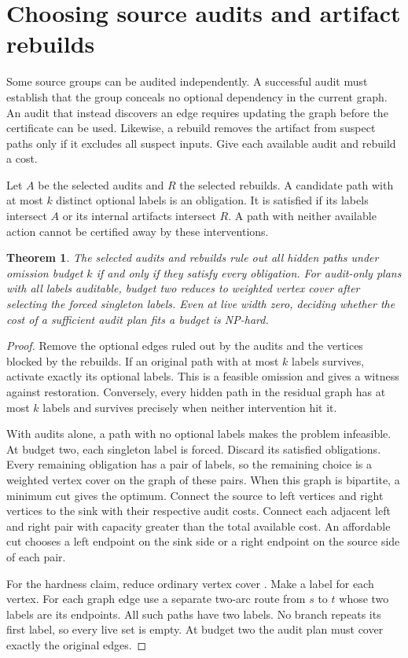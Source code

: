\documentclass[11pt]{article}
\newtheorem{theorem}{Theorem}
\begin{document}
\section{Choosing source audits and artifact rebuilds}
Some source groups can be audited independently. A successful audit
must establish that the group conceals no optional dependency in
the current graph. An audit that instead discovers an edge requires
updating the graph before the certificate can be used. Likewise, a
rebuild removes the artifact from suspect paths only if it excludes
all suspect inputs. Give each available audit and rebuild a cost.

Let $A$ be the selected audits and $R$ the selected rebuilds. A
candidate path with at most $k$ distinct optional labels is an
obligation. It is satisfied if its labels intersect $A$ or its
internal artifacts intersect $R$. A path with neither available
action cannot be certified away by these interventions.

\begin{theorem}
The selected audits and rebuilds rule out all hidden paths under
omission budget $k$ if and only if they satisfy every obligation.
For audit-only plans with all labels auditable, budget two reduces
to weighted vertex cover after selecting the forced singleton
labels. Even at live width zero, deciding whether the cost of a
sufficient audit plan fits a budget is NP-hard.
\end{theorem}
\begin{proof}
Remove the optional edges ruled out by the audits and the vertices
blocked by the rebuilds. If an original path with at most $k$ labels
survives, activate exactly its optional labels. This is a feasible
omission and gives a witness against restoration. Conversely, every
hidden path in the residual graph has at most $k$ labels and
survives precisely when neither intervention hit it.

With audits alone, a path with no optional labels makes the
problem infeasible. At budget two, each singleton label is forced.
Discard its satisfied obligations. Every remaining obligation has
a pair of labels, so the remaining choice is a weighted vertex
cover on the graph of these pairs. When this graph is bipartite,
a minimum cut gives the optimum. Connect the source to left
vertices and right vertices to the sink with their respective
audit costs. Connect each adjacent left and right pair with capacity
greater than the total available cost. An affordable cut chooses a
left endpoint on the sink side or a right endpoint on the source
side of each pair.

For the hardness claim, reduce ordinary vertex cover \cite{karp}.
Make a label for each vertex. For each graph edge use a separate
two-arc route from $s$ to $t$ whose two labels are its endpoints.
All such paths have two labels. No branch repeats its first label,
so every live set is empty. At budget two the audit plan must
cover exactly the original edges.
\end{proof}
\end{document}

